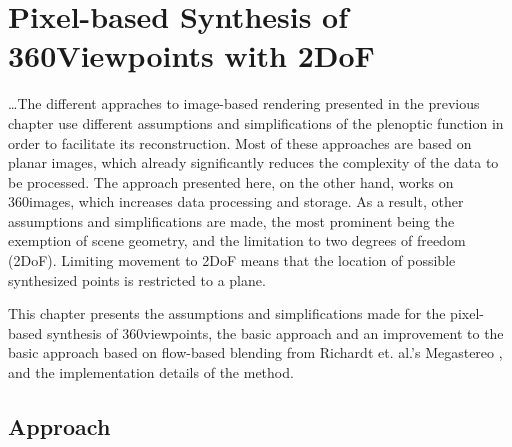\chapter{Pixel-based Synthesis of 360\degree Viewpoints with 2DoF}

\ldots The different appraches to image-based rendering presented in the previous chapter use different assumptions and simplifications of the plenoptic function in order to facilitate its reconstruction. Most of these approaches are based on planar images, which already significantly reduces the complexity of the data to be processed. The approach presented here, on the other hand, works on 360\degree images, which increases data processing and storage. As a result, other assumptions and simplifications are made, the most prominent being the exemption of scene geometry, and the limitation to two degrees of freedom (2DoF). Limiting movement to 2DoF means that the location of possible synthesized points is restricted to a plane. 

This chapter presents the assumptions and simplifications made for the pixel-based synthesis of 360\degree viewpoints, the basic approach and an improvement to the basic approach based on flow-based blending from Richardt et. al.'s Megastereo \cite{megastereo}, and the implementation details of the method.

\section{Approach}


